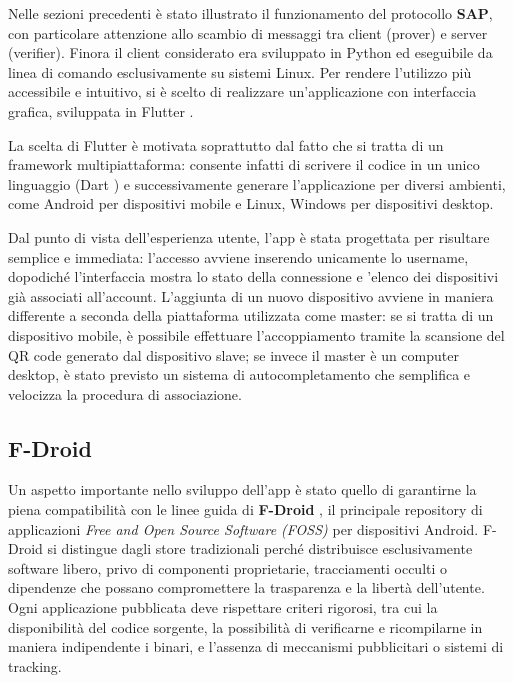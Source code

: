 Nelle sezioni precedenti è stato illustrato il funzionamento del protocollo \textbf{SAP}, con particolare attenzione allo scambio di messaggi tra client (prover) e server (verifier). Finora il client considerato era sviluppato in Python ed eseguibile da linea di comando esclusivamente su sistemi Linux. Per rendere l'utilizzo più accessibile e intuitivo, si è scelto di realizzare un'applicazione con interfaccia grafica, sviluppata in Flutter \cite{flutter}.

La scelta di Flutter è motivata soprattutto dal fatto che si tratta di un framework multipiattaforma: consente infatti di scrivere il codice in un unico linguaggio (Dart \cite{dart}) e successivamente generare l'applicazione per diversi ambienti, come Android per dispositivi mobile e Linux, Windows per dispositivi desktop.

Dal punto di vista dell'esperienza utente, l'app è stata progettata per risultare semplice e immediata: l'accesso avviene inserendo unicamente lo username, dopodiché l'interfaccia mostra lo stato della connessione e 'elenco dei dispositivi già associati all'account. L'aggiunta di un nuovo dispositivo avviene in maniera differente a seconda della piattaforma utilizzata come master: se si tratta di un dispositivo mobile, è possibile effettuare l'accoppiamento tramite la scansione del QR code generato dal dispositivo slave; se invece il master è un computer desktop, è stato previsto un sistema di autocompletamento che semplifica e velocizza la procedura di associazione.

\subsection{F-Droid}
Un aspetto importante nello sviluppo dell'app è stato quello di garantirne la piena compatibilità con le linee guida di \textbf{F-Droid} \cite{fdroid}, il principale repository di applicazioni \textit{Free and Open Source Software (FOSS)} per dispositivi Android. F-Droid si distingue dagli store tradizionali perché distribuisce esclusivamente software libero, privo di componenti proprietarie, tracciamenti occulti o dipendenze che possano compromettere la trasparenza e la libertà dell'utente. Ogni applicazione pubblicata deve rispettare criteri rigorosi, tra cui la disponibilità del codice sorgente, la possibilità di verificarne e ricompilarne in maniera indipendente i binari, e l'assenza di meccanismi pubblicitari o sistemi di tracking.

